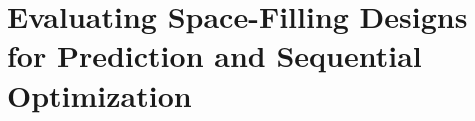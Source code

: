 \documentclass [PhD] {package/uclathes}
\begin{document}
\chapter{Evaluating Space-Filling Designs for Prediction and Sequential Optimization}
%
%
%
%
%
%
%
%
%
%
%
%
%
%
%
%
%
\end{document}
